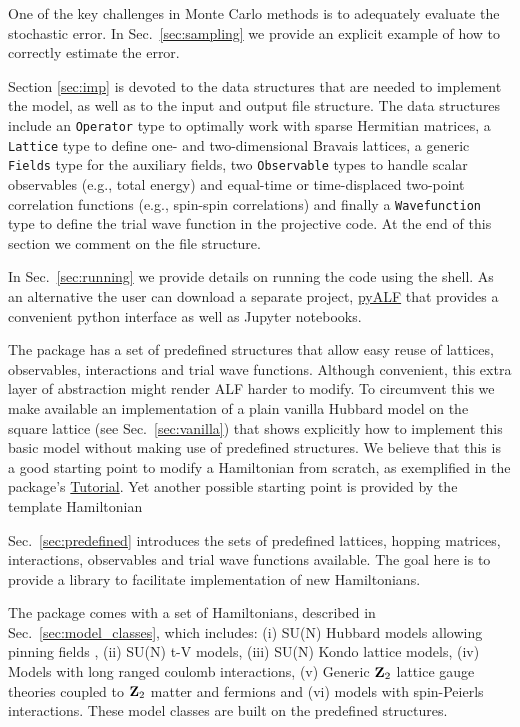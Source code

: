 One of the key challenges in  Monte Carlo methods is to  adequately evaluate the stochastic error.  In Sec.~\ref{sec:sampling}  we provide an explicit example  of how to correctly estimate the   error. 

Section \ref{sec:imp} is devoted to the data structures that are needed to implement the model, as well as to the input and output file structure.   
The data structures include an \texttt{Operator} type to optimally work with sparse Hermitian matrices,
a \texttt{Lattice} type  to define one- and two-dimensional Bravais lattices,
a generic \texttt{Fields} type for the auxiliary fields,
two \texttt{Observable} types to handle scalar observables (e.g., total energy) and equal-time or time-displaced two-point correlation functions (e.g., spin-spin correlations) and finally a \texttt{Wavefunction} type  to define the trial wave function in the projective code.
At the end of this section we comment on the file structure.

In Sec.~\ref{sec:running}   we provide details on running the code  using the shell.  As an alternative the user can download a separate project, \href{https://github.com/ALF-QMC/pyALF/tree/\pyALFbranch}{pyALF}   that provides a convenient python interface as well as  Jupyter  notebooks. 

The package has a set of predefined structures that allow easy reuse of lattices, observables, interactions and trial wave functions.   Although convenient, this extra layer of abstraction might 
render ALF harder to modify. To circumvent this we make available an implementation of a plain vanilla Hubbard model on the square lattice (see Sec.~\ref{sec:vanilla}) that shows explicitly how to implement this basic model without making use of predefined structures.  We believe that this is a good starting point to modify a Hamiltonian from scratch, as exemplified in the package's \href{https://github.com/ALF-QMC/ALF_Tutorial_and_Presentations/tree/master/Tutorial-ALF-\tutALFver/}{Tutorial}. Yet another possible starting point is provided by the template Hamiltonian 

Sec.~\ref{sec:predefined}   introduces the sets of predefined lattices,  hopping matrices,  interactions, observables and trial wave functions available.  The goal here is to provide a 
library  to facilitate  implementation of new  Hamiltonians. 

The package comes with a set of Hamiltonians, described in Sec.~\ref{sec:model_classes}, which includes: (i) SU(N) Hubbard models allowing pinning fields \cite{Assaad13}, (ii) SU(N) t-V models, (iii) SU(N) Kondo lattice models, (iv)    Models with long ranged coulomb interactions,  (v) Generic $\mathbf{Z}_{2}$ lattice gauge theories coupled to $\mathbf{Z}_{2}$ matter and fermions and (vi)  models with spin-Peierls interactions.  These model classes are built on the predefined structures. 

